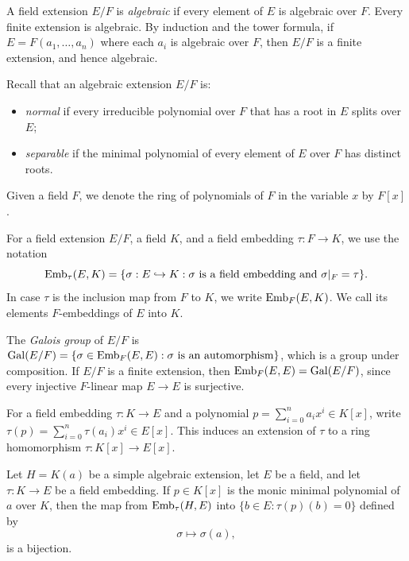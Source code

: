 A field extension $E/F$ is \emph{algebraic} if every element of $E$ is algebraic over $F$.
Every finite extension is algebraic.
By induction and the tower formula, if $ E=F(a_1,\ldots,a_n)
$ where  each $a_i$ is algebraic over $F$,
then $E/F$ is a finite extension, and hence algebraic.

Recall that an algebraic extension $E/F$ is:
\begin{itemize}
       \item \emph{normal} if every irreducible polynomial over
$F$ that has a root in $E$ splits over $E$;
       \item \emph{separable} if the minimal polynomial of every element of $E$ over $F$ has distinct roots.
\end{itemize}

Given a field $F$, we denote the ring of polynomials of $F$ in the variable $x$ by $F[x]$.


For a field extension $E/F$, a field $K$, and a field embedding $\tau:F\to K$, we use the notation
\[
 \operatorname{Emb}_{\tau}(E,K)
 =\{\sigma:E\hookrightarrow K:\sigma\text{ is a field embedding and }
       \sigma|_F=\tau\}.
\]
In case $\tau$ is the inclusion map from $F$ to $K$, we write $\operatorname{Emb}_F(E,K)$.
We call its elements $F$-embeddings of $E$ into $K$.

The \emph{Galois group} of $E/F$ is $\operatorname{Gal}(E/F)=\{\sigma\in\operatorname{Emb}_F(E,E):\sigma\text{ is an automorphism}\}$, which is a group under composition.
If $E/F$ is a finite extension, then $\operatorname{Emb}_F(E,E)=\operatorname{Gal}(E/F)$, since every injective $F$-linear map $E\to E$ is surjective.

For a field embedding $\tau:K\to E$ and a polynomial
$p=\sum_{i=0}^n a_i x^i\in K[x]$, write $\tau(p)=\sum_{i=0}^n\tau(a_i)x^i\in E[x]$.
This induces an extension of $\tau$ to a ring homomorphism $\tau:K[x]\to E[x]$.

\begin{lemma}\label{lem:simple-embeddings}
Let $H=K(a)$ be a simple algebraic extension, let $E$ be a field,
and let $\tau:K\to E$ be a field embedding.
If $p\in K[x]$ is the monic minimal polynomial of $a$ over $K$,
then the map from $\operatorname{Emb}_{\tau}(H,E)$ into $\{b\in E:\tau(p)(b)=0\}$ defined by
\[
 \sigma\longmapsto\sigma(a),
\]
is a bijection.
\end{lemma}

